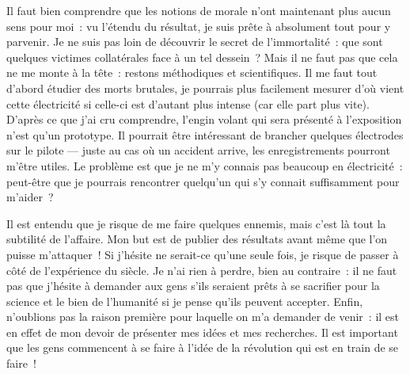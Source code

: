 {Il faut bien comprendre que les notions de morale n’ont maintenant plus aucun sens pour moi~:  vu l’étendu du résultat, je suis prête à absolument tout pour y parvenir.
Je ne suis pas loin de découvrir le secret de l’immortalité~:  que sont quelques victimes collatérales face à un tel dessein~?
Mais il ne faut pas que cela ne me monte à la tête~:  restons méthodiques et scientifiques.
Il me faut tout d’abord étudier des morts brutales, je pourrais plus facilement mesurer d’où vient cette électricité si celle-ci est d’autant plus intense (car elle part plus vite).
D’après ce que j’ai cru comprendre, l’engin volant qui sera présenté à l’exposition n’est qu’un prototype.
Il pourrait être intéressant de brancher quelques électrodes sur le pilote — juste au cas où un accident arrive, les enregistrements pourront m’être utiles.
Le problème est que je ne m’y connais pas beaucoup en électricité~:  peut-être que je pourrais rencontrer quelqu’un qui s’y connait suffisamment pour m’aider~?

Il est entendu que je risque de me faire quelques ennemis, mais c’est là tout la subtilité de l’affaire.
Mon but est de publier des résultats avant même que l’on puisse m’attaquer~!
Si j’hésite ne serait-ce qu’une seule fois, je risque de passer à côté de l’expérience du siècle.
Je n’ai rien à perdre, bien au contraire~:  il ne faut pas que j’hésite à demander aux gens s’ils seraient prêts à se sacrifier pour la science et le bien de l’humanité si je pense qu’ils peuvent accepter.
Enfin, n’oublions pas la raison première pour laquelle on m’a demander de venir~:  il est en effet de mon devoir de présenter mes idées et mes recherches.
Il est important que les gens commencent à se faire à l’idée de la révolution qui est en train de se faire~!
}

